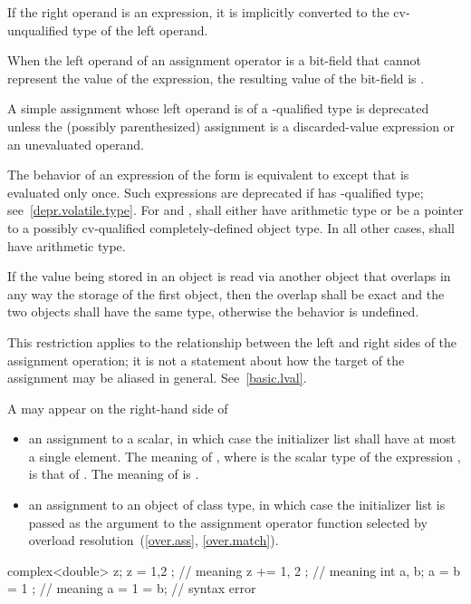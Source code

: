 \pnum
{}%
If the right operand is an expression, it is implicitly
converted to the cv-unqualified type of the left
operand.

\pnum
{}%
When the left operand of an assignment operator
is a bit-field that cannot represent the value of the expression, the
resulting value of the bit-field is
.

\pnum
A simple assignment whose left operand is of
a -qualified type is deprecated
unless the (possibly parenthesized) assignment is a discarded-value expression or
an unevaluated operand.

\pnum
The behavior of an expression of the form 
is equivalent to  except
that  is evaluated only once.
Such expressions are deprecated
if  has -qualified type; see~\ref{depr.volatile.type}.
For \tcode{+=} and \tcode{-=},
 shall either have arithmetic type or be a pointer to a
possibly cv-qualified completely-defined object type. In all other
cases,  shall have arithmetic type.

\pnum
If the value being stored in an object is read via another object that
overlaps in any way the storage of the first object, then the overlap shall be
exact and the two objects shall have the same type, otherwise the behavior is
undefined.
\begin{note}
This restriction applies to the relationship
between the left and right sides of the assignment operation; it is not a
statement about how the target of the assignment may be aliased in general.
See~\ref{basic.lval}.
\end{note}

\pnum
A  may appear on the right-hand side of
\begin{itemize}
\item an assignment to a scalar, in which case the initializer list shall have
at most a single element. The meaning of , where  is the
scalar type of the expression , is that of . The meaning of
 is .

\item an assignment to an object of class type, in which case the initializer
list is passed as the argument to the assignment operator function selected by
overload resolution~(\ref{over.ass}, \ref{over.match}).
\end{itemize}
\begin{example}
\begin{codeblock}
complex<double> z;
z = { 1,2 };        // meaning 
z += { 1, 2 };      // meaning 
int a, b;
a = b = { 1 };      // meaning 
a = { 1 } = b;      // syntax error
\end{codeblock}
\end{example}

